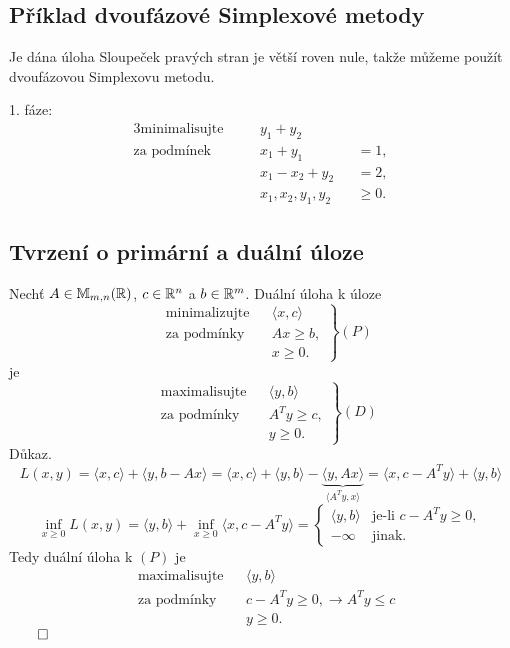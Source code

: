 \subsection{Příklad dvoufázové Simplexové metody}
Je dána úloha
Sloupeček pravých stran je větší roven nule, takže můžeme použít dvoufázovou Simplexovu metodu.

1. fáze:
\begin{alignat*}{3}
    \text{minimalisujte} &&  y_1 + y_2  &&      \\
    \text{za podmínek } &\quad&  x_1 + y_1  && {}= 1, \\
                        &\quad&  x_1 - x_2 + y_2 && {}= 2, \\
                        &\quad&  x_1, x_2, y_1, y_2 && {}\geq 0.
\end{alignat*}

\subsection{Tvrzení o primární a duální úloze}
Nechť $A \in \mathbb{M}_{m,n}(\mathbb{R})$, $c \in \mathbb{R}^n$ a $b \in \mathbb{R}^m$. Duální úloha k úloze
\[
\left.\begin{aligned}
    &\text{minimalizujte}&& \langle x, c \rangle \\
    &\text{za podmínky}  && Ax \geq b, \\
    &                    && x \geq 0.
\end{aligned}
\right\} (P)
\]
je
\[
\left.\begin{aligned}
    &\text{maximalisujte}&& \langle y,b \rangle \\
    &\text{za podmínky}  && A^Ty \geq c, \\
    &                    && y \geq 0.
\end{aligned}
\right\} (D)
\]
Důkaz. 
\[
    L(x, y) = \langle x, c\rangle + \langle y, b- Ax\rangle = \langle x, c\rangle + \langle y, b\rangle - 
    \underbrace{\langle y, Ax\rangle}_{\langle A^Ty, x\rangle} = \langle x, c-A^Ty\rangle + \langle y, b\rangle
\]
\[
    \inf_{x\geq 0} L(x, y) = \langle y, b\rangle + \inf_{x\geq 0} \langle x, c-A^Ty\rangle =
    \begin{cases}
        \langle y, b\rangle & \text{je-li } c-A^Ty \geq 0, \\
        - \infty & \text{jinak.}
    \end{cases}
\]
Tedy duální úloha k $(P)$ je 
\[
\begin{aligned}
    &\text{maximalisujte}&& \langle y,b \rangle \\
    &\text{za podmínky}  && c-A^T y \geq 0, \rightarrow A^T y \leq c \\
    &                    && y \geq 0.
\end{aligned}
\]
$\qed$

